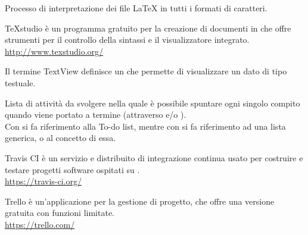 Processo di interpretazione dei file \LaTeX{} in tutti i formati di caratteri.

TeXstudio è un programma gratuito per la creazione di documenti in \glossario{\LaTeX} che offre strumenti per il controllo della sintassi e il visualizzatore integrato.\\
\url{http://www.texstudio.org/}

Il termine TextView definisce un  che permette di visualizzare un dato di tipo testuale.

Lista di attività da svolgere nella quale è possibile spuntare ogni singolo compito quando viene portato a termine (attraverso  e/o ).\\
Con  si fa riferimento alla  To-do list, mentre con  si fa riferimento ad una lista generica, o al concetto di essa.

Travis CI è un servizio  e distribuito di integrazione continua usato per costruire e testare progetti software ospitati su .\\
\url{https://travis-ci.org/}

Trello è un’applicazione per la gestione di progetto, che offre una versione gratuita con funzioni limitate.\\
\url{https://trello.com/}
\clearpage
